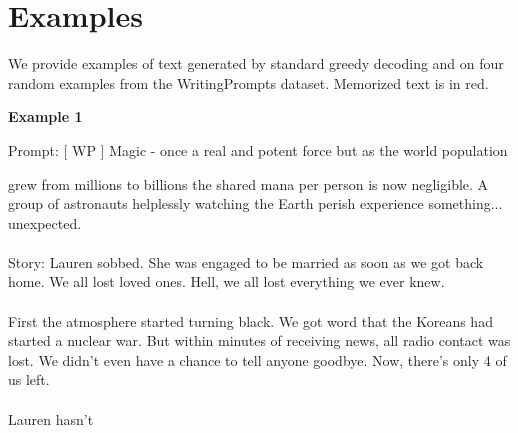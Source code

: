 \newpage
\appendix
\onecolumn
\section{Examples}%
We provide examples of text generated by standard greedy decoding and \sys on four random examples from the WritingPrompts dataset. Memorized text is in red.
\label{appendix:examples}

\textbf{Example 1}

\begin{tcolorbox}[
    base style,
    colback=boxcolor,
    coltitle=white,
    colbacktitle=headercolor,
    title=Prefix
]
\text{\#\#\#} Prompt: [ WP ] Magic - once a real and potent force but as the world population
\end{tcolorbox}

\vspace{2mm}

\begin{tcolorbox}[
    base style,
    colback=boxcolor,
    coltitle=white,
    colbacktitle=headercolor,
    title=Suffix
]
grew from millions to billions the shared mana per person is now negligible. A group of astronauts helplessly watching the Earth perish experience something... unexpected.
\\
\\
\text{\#\#\#} Story: Lauren sobbed. She was engaged to be married as soon as we got back home. We all lost loved ones. Hell, we all lost everything we ever knew. 
\\
\\
First the atmosphere started turning black. We got word that the Koreans had started a nuclear war. But within minutes of receiving news, all radio contact was lost. We didn't even have a chance to tell anyone goodbye. Now, there's only 4 of us left. 
\\
\\
Lauren hasn't
\end{tcolorbox}

\vspace{2mm}


